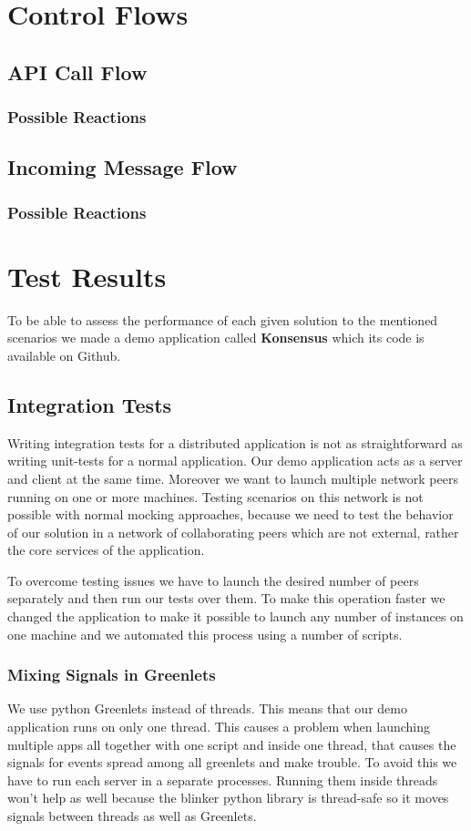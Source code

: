 \section{Control Flows}
\subsection{API Call Flow}
\subsubsection{Possible Reactions}
\subsection{Incoming Message Flow}
\subsubsection{Possible Reactions}


\section{Test Results}
To be able to assess the performance of each given solution to the mentioned scenarios we made a demo application
called \textbf{Konsensus} which its code is available on Github. \cite{konsensus}

\subsection{Integration Tests}
Writing integration tests for a distributed application is not as straightforward as writing unit-tests for a normal application. 
Our demo application acts as a server and client at the same time. Moreover we want to launch multiple 
network peers running on one or more machines. Testing scenarios on this network is not possible with
normal mocking approaches, because we need to test the behavior of our solution in a network of collaborating
peers which are not external, rather the core services of the application.

To overcome testing issues we have to launch the desired number of peers separately and then run our tests 
over them. To make this operation faster we changed the application to make it possible to launch any number
of instances on one machine and we automated this process using a number of scripts. %

\subsubsection{Mixing Signals in Greenlets}
We use python Greenlets instead of threads. This means that our demo application runs on only one thread. 
This causes a problem when launching multiple apps all together with one script and inside one thread, that
causes the signals for events spread among all greenlets and make trouble. To avoid this we have to run
each server in a separate processes. Running them inside threads won't help as well because the blinker python
library is thread-safe so it moves signals between threads as well as Greenlets.

